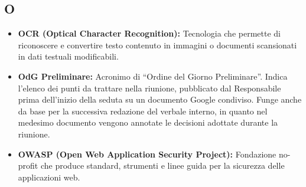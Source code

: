 \subsection*{O}
\begin{itemize}[leftmargin=*]
    \item \textbf{OCR (Optical Character Recognition):} Tecnologia che permette di riconoscere e convertire testo contenuto in immagini o documenti scansionati in dati testuali modificabili.
    \item \textbf{OdG Preliminare:} Acronimo di ``Ordine del Giorno Preliminare''.
          Indica l'elenco dei punti da trattare nella riunione, pubblicato dal
          Responsabile prima dell'inizio della seduta su un documento Google
          condiviso. Funge anche da base per la successiva redazione del verbale
          interno, in quanto nel medesimo documento vengono annotate le decisioni
          adottate durante la riunione.
    \item \textbf{OWASP (Open Web Application Security Project):} Fondazione no-profit che produce standard, strumenti e linee guida per la sicurezza delle applicazioni web.
\end{itemize}
 
{}
